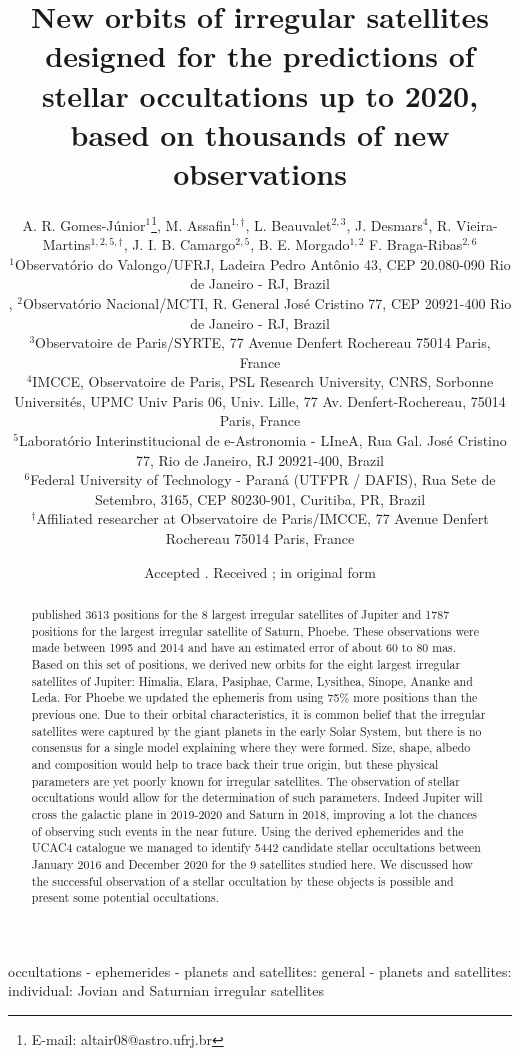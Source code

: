 \documentclass[useAMS,usenatbib]{mn2e}
\title[Orbits and predictions for occultations up to 2020]{New orbits of irregular satellites designed for the predictions of stellar occultations up to 2020, based on thousands of new observations}
\author[A. R. Gomes-J\'unior, M. Assafin, L. Beauvalet et al.]{A. R. Gomes-J\'unior$^{1}$\thanks{E-mail: altair08@astro.ufrj.br},
M. Assafin$^{1,\dag}$,
L. Beauvalet$^{2,3}$,
J. Desmars$^{4}$,\newauthor
R. Vieira-Martins$^{1,2,5,\dag}$,
J. I. B. Camargo$^{2,5}$,
B. E. Morgado$^{1,2}$
F. Braga-Ribas$^{2,6}$
\\
$^{1}$Observat\'orio do Valongo/UFRJ, Ladeira Pedro Ant\^onio 43,
CEP 20.080-090 Rio de Janeiro - RJ, Brazil\\,
$^{2}$Observat\'orio Nacional/MCTI, R. General Jos\'e Cristino 77, CEP 20921-400 Rio de Janeiro - RJ, Brazil\\
$^{3}$Observatoire de Paris/SYRTE, 77 Avenue Denfert Rochereau 75014 Paris, France\\
$^{4}$IMCCE, Observatoire de Paris, PSL Research University, CNRS, Sorbonne Universités, UPMC Univ Paris 06, Univ. Lille, 77 Av. Denfert-Rochereau, 75014 Paris, France\\
$^{5}$Laborat\'orio Interinstitucional de e-Astronomia - LIneA, Rua Gal. Jos\'e Cristino 77, Rio de Janeiro, RJ 20921-400, Brazil\\
$^{6}$Federal University of Technology - Paran\'a (UTFPR / DAFIS), Rua Sete de Setembro, 3165, CEP 80230-901, Curitiba, PR, Brazil\\
$^\dag$Affiliated researcher at Observatoire de Paris/IMCCE, 77 Avenue Denfert Rochereau 75014 Paris, France
}
\begin{document}
\newcommand{\noccs}{5442 } %

\date{Accepted . Received ; in original form }

\pagerange{\pageref{firstpage}--\pageref{lastpage}} 

\maketitle

\label{firstpage}

\begin{abstract}
\cite{GomesJunior2015} published 3613 positions for the 8 largest irregular satellites of Jupiter and 1787 positions for the largest irregular satellite of Saturn, Phoebe.  These observations were made between 1995 and 2014 and have an estimated error of about 60 to 80 mas. Based on this set of positions, we derived new orbits for the eight largest irregular satellites of Jupiter: Himalia, Elara, Pasiphae, Carme, Lysithea, Sinope, Ananke and Leda. %
For Phoebe we updated the ephemeris from \cite{Desmars2013} using 75\% more positions than the previous one. Due to their orbital characteristics, it is common belief that the irregular satellites were captured by the giant planets in the early Solar System, but there is no consensus for a single model explaining where they were formed. Size, shape, albedo and composition would help to trace back their true origin, but these physical parameters are yet poorly known for irregular satellites. The observation of stellar occultations would allow for the determination of such parameters. Indeed Jupiter will cross the galactic plane in 2019-2020 and Saturn in 2018, improving a lot the chances of observing such events in the near future. Using the derived ephemerides and the UCAC4 catalogue we managed to identify \noccs candidate stellar occultations between January 2016 and December 2020 for the 9 satellites studied here. We discussed how the successful observation of a stellar occultation by these objects is possible and present some potential occultations.
\end{abstract}

\begin{keywords}
occultations - ephemerides - planets and satellites: general - planets and satellites: individual: Jovian and Saturnian irregular satellites
\end{keywords}
\end{document}
